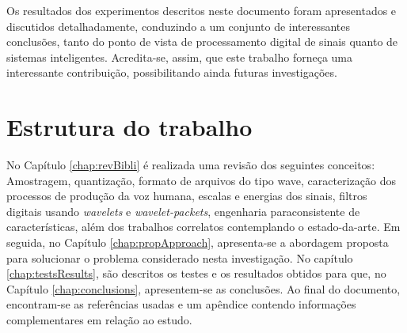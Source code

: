 		\par Os resultados dos experimentos descritos neste documento foram apresentados e discutidos detalhadamente, conduzindo a um conjunto de interessantes conclusões, tanto do ponto de vista de processamento digital de sinais quanto de sistemas inteligentes. Acredita-se, assim, que este trabalho forneça uma interessante contribuição, possibilitando ainda futuras investigações. 
	
	\section{Estrutura do trabalho}
		\par No Capítulo \ref{chap:revBibli} é realizada uma revisão dos seguintes conceitos: Amostragem, quantização, formato de arquivos do tipo wave, caracterização dos processos de produção da voz humana, escalas e energias dos sinais, filtros digitais usando \textit{wavelets} e \textit{wavelet-packets}, engenharia paraconsistente de características, além dos trabalhos correlatos contemplando o estado-da-arte. Em seguida, no Capítulo \ref{chap:propApproach}, apresenta-se a abordagem proposta para solucionar o problema considerado nesta investigação. No capítulo \ref{chap:testsResults}, são descritos os testes e os resultados obtidos para que, no Capítulo \ref{chap:conclusions}, apresentem-se as conclusões. Ao final do documento, encontram-se as referências usadas e um apêndice contendo informações complementares em relação ao estudo.
